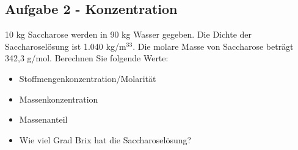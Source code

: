 \documentclass[a4paper,11pt]{article}
\newcommand{\antwort}[1]{
\begin{tcolorbox}[
	enhanced,
	enforce breakable,
	standard jigsaw,
	boxrule=0.7pt,
	colframe=black,
	sharp corners,
	boxsep=5pt,
	title=\bfseries \sffamily Antwort,
	opacityback=0,
	coltitle=miudiutex,
	attach boxed title to top text left={yshift=-\tcboxedtitleheight/2},
	boxed title style={colback=white,colframe=white},
	bottomrule at break=0pt,
	toprule at break=0pt,
	pad at break=16mm,
]
	\begin{center}
	#1
	\end{center}
	\end{tcolorbox}
}
\newif\ifshowme
\begin{document}
\subsection*{Aufgabe 2 - Konzentration}
10 kg Saccharose werden in 90 kg Wasser gegeben. Die Dichte der Saccharoselösung ist 1.040 kg/m$^33$. Die molare Masse von Saccharose beträgt 342,3 g/mol. Berechnen Sie folgende Werte: 

\begin{itemize}
\item Stoffmengenkonzentration/Molarität

\ifshowme
\antwort{
\begin{align*}
c = \frac{n}{V} = \frac{m / M}{m / \rho} &= \frac{10~\text{kg} ~/~ 0,3423~\text{kg$\cdot$mol}^{-1}}{100 ~\text{kg} ~/~ 1.040~\text{kg$\cdot$m}^{-3}}\\ &= 303,83~\text{mol/m}^3 \\
&= 0,3~\text{mol/L}
\end{align*}
}
\else
\fi
\item Massenkonzentration
\ifshowme
\antwort{
\begin{align*}
\beta = \frac{m}{V} = \frac{m}{m / \rho} = \frac{10~\text{kg}}{100 ~\text{kg} / 1.040~\text{kg/m}^3} = 104 ~\text{kg/m}^3
\end{align*}
}
\else
\fi
\item Massenanteil
\ifshowme
\antwort{
\begin{align*}
w = \frac{m}{m} = \frac{10~\text{kg}}{100~\text{kg}} = 0,1 = 10\%
\end{align*}
}
\else
\fi
\item Wie viel Grad Brix hat die Saccharoselösung?
\ifshowme
\antwort{
1 Grad Brix entspricht der Dichte von 1 g Saccharose in 100 g Lösung \par oder: \par 
Gew.\% multipliziert mit 100
\begin{align*}
\text{Brix} = 0,1 \cdot 100 = 10
\end{align*}
}
\pagebreak
\else
\fi

\end{itemize}


\pagebreak
\end{document}

